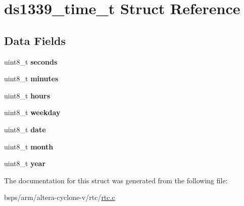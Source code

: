 \hypertarget{structds1339__time__t}{}\section{ds1339\+\_\+time\+\_\+t Struct Reference}
\label{structds1339__time__t}
\subsection*{Data Fields}
\begin{DoxyCompactItemize}
\item 
\mbox{\label{structds1339__time__t_a59d0340f1b8e098d85206ebc7c026d06}} 
uint8\+\_\+t {\bfseries seconds}
\item 
\mbox{\label{structds1339__time__t_ad37305f642a4629bcadfec2ce2598207}} 
uint8\+\_\+t {\bfseries minutes}
\item 
\mbox{\label{structds1339__time__t_a70ae1e95c777774762b77d61dfa184aa}} 
uint8\+\_\+t {\bfseries hours}
\item 
\mbox{\label{structds1339__time__t_a5385a727e09ed9529969506f9be87780}} 
uint8\+\_\+t {\bfseries weekday}
\item 
\mbox{\label{structds1339__time__t_a9924f0bdeba7a70f3bc4aec5464f7d5f}} 
uint8\+\_\+t {\bfseries date}
\item 
\mbox{\label{structds1339__time__t_ae74c1fa93e01165b75cdd69b48ad948b}} 
uint8\+\_\+t {\bfseries month}
\item 
\mbox{\label{structds1339__time__t_a02ed89c4f17edb49013489dc3899e4f7}} 
uint8\+\_\+t {\bfseries year}
\end{DoxyCompactItemize}


The documentation for this struct was generated from the following file\+:\begin{DoxyCompactItemize}
\item 
bsps/arm/altera-\/cyclone-\/v/rtc/\mbox{\hyperlink{arm_2altera-cyclone-v_2rtc_2rtc_8c}{rtc.\+c}}\end{DoxyCompactItemize}
